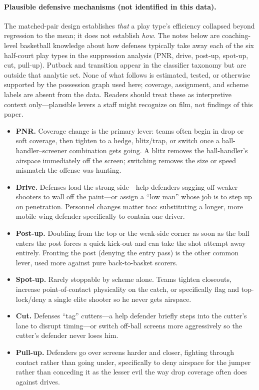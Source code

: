 \documentclass[11pt]{article}
\begin{document}
\paragraph{Plausible defensive mechanisms (not identified in this data).}
The matched-pair design establishes \emph{that} a play type's efficiency collapsed beyond regression to the mean; it does not establish \emph{how}. The notes below are coaching-level basketball knowledge about how defenses typically take away each of the six half-court play types in the suppression analysis (PNR, drive, post-up, spot-up, cut, pull-up). Putback and transition appear in the classifier taxonomy but are outside that analytic set. None of what follows is estimated, tested, or otherwise supported by the possession graph used here; coverage, assignment, and scheme labels are absent from the data. Readers should treat these as interpretive context only---plausible levers a staff might recognize on film, not findings of this paper.
\begin{itemize}
  \item \textbf{PNR.} Coverage change is the primary lever: teams often begin in drop or soft coverage, then tighten to a hedge, blitz/trap, or switch once a ball-handler--screener combination gets going. A blitz removes the ball-handler's airspace immediately off the screen; switching removes the size or speed mismatch the offense was hunting.
  \item \textbf{Drive.} Defenses load the strong side---help defenders sagging off weaker shooters to wall off the paint---or assign a ``low man'' whose job is to step up on penetration. Personnel changes matter too: substituting a longer, more mobile wing defender specifically to contain one driver.
  \item \textbf{Post-up.} Doubling from the top or the weak-side corner as soon as the ball enters the post forces a quick kick-out and can take the shot attempt away entirely. Fronting the post (denying the entry pass) is the other common lever, used more against pure back-to-basket scorers.
  \item \textbf{Spot-up.} Rarely stoppable by scheme alone. Teams tighten closeouts, increase point-of-contact physicality on the catch, or specifically flag and top-lock/deny a single elite shooter so he never gets airspace.
  \item \textbf{Cut.} Defenses ``tag'' cutters---a help defender briefly steps into the cutter's lane to disrupt timing---or switch off-ball screens more aggressively so the cutter's defender never loses him.
  \item \textbf{Pull-up.} Defenders go over screens harder and closer, fighting through contact rather than going under, specifically to deny airspace for the jumper rather than conceding it as the lesser evil the way drop coverage often does against drives.
\end{itemize}
\end{document}
